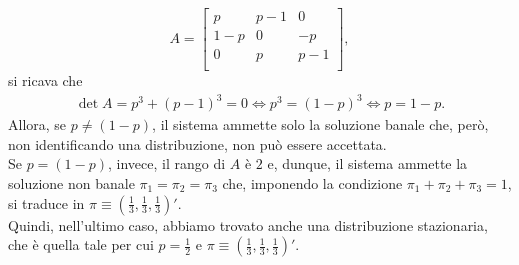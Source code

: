 \documentclass[12pt]{homework}
\begin{document}
  \begin{equation*}
  A=\begin{bmatrix}
  p & p-1 & 0\\
  1-p & 0 & -p \\
  0 & p & p-1\\
  \end{bmatrix},
  \end{equation*}
 si ricava che
 \begin{gather*}
 \det A=p^{3}+\left(p-1\right)^{3}=0\Leftrightarrow p^{3}=\left(1-p\right)^{3}\Leftrightarrow p=1-p.
 \end{gather*}
 Allora, se $p\neq \left(1-p\right)$, il sistema ammette solo la soluzione banale che, però, non identificando una distribuzione, non può essere accettata.\\
 Se $p=\left(1-p\right)$, invece, il rango di $A$ è $2$ e, dunque, il sistema ammette la soluzione non banale $\pi_{1}=\pi_{2}=\pi_{3}$ che, imponendo la condizione $\pi_{1}+\pi_{2}+\pi_{3}=1$, si traduce in $\pi\equiv\left(\frac{1}{3},\frac{1}{3},\frac{1}{3}\right)'$.\\
 Quindi, nell'ultimo caso, abbiamo trovato anche una distribuzione stazionaria, che è quella tale per cui $p=\frac{1}{2}$ e $\pi\equiv\left(\frac{1}{3},\frac{1}{3},\frac{1}{3}\right)'$.
 
 \newpage
\end{document}
